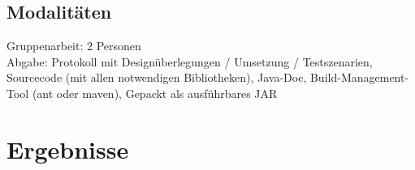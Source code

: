 \documentclass[letterpaper, 12pt]{article}
\let\tempsection\section
\renewcommand\section[1]{\vspace{-0.3cm}\tempsection{#1}\vspace{-0.3cm}}
\let\tempsubsection\subsection
\renewcommand\subsection[1]{\vspace{0cm}\tempsubsection{#1}\vspace{0cm}}
\begin{document}
\subsection{Modalitäten}
Gruppenarbeit: 2 Personen \\
Abgabe: Protokoll mit Designüberlegungen / Umsetzung / Testszenarien, Sourcecode (mit allen notwendigen Bibliotheken), Java-Doc, Build-Management-Tool (ant oder maven), Gepackt als ausführbares JAR

\clearpage

\section{Ergebnisse}

\newpage



\lstlistoflistings
\listoffigures
\end{document}
